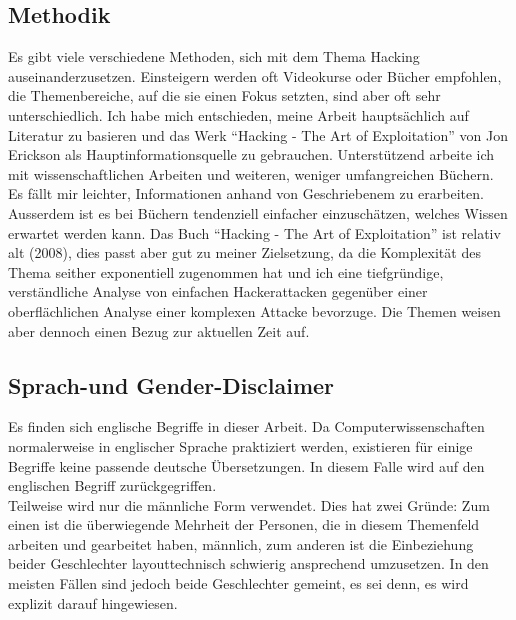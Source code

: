 \documentclass[11pt, a4paper]{article}
\begin{document}
\subsection{Methodik}
Es gibt viele verschiedene Methoden, sich mit dem Thema Hacking auseinanderzusetzen. Einsteigern werden oft Videokurse oder Bücher empfohlen, die Themenbereiche, auf die sie einen Fokus setzten, sind aber oft sehr unterschiedlich. Ich habe mich entschieden, meine Arbeit hauptsächlich auf Literatur zu basieren und das Werk ``Hacking - The Art of Exploitation'' von Jon Erickson als Hauptinformationsquelle zu gebrauchen. Unterstützend arbeite ich mit wissenschaftlichen Arbeiten und weiteren, weniger umfangreichen Büchern. Es fällt mir leichter, Informationen anhand von Geschriebenem zu erarbeiten. Ausserdem ist es bei Büchern tendenziell einfacher einzuschätzen, welches Wissen erwartet werden kann. Das Buch ``Hacking - The Art of Exploitation'' ist relativ alt (2008), dies passt aber gut zu meiner Zielsetzung, da die Komplexität des Thema seither exponentiell zugenommen hat und ich eine tiefgründige, verständliche Analyse von einfachen Hackerattacken gegenüber einer oberflächlichen Analyse einer komplexen Attacke bevorzuge. Die Themen weisen aber dennoch einen Bezug zur aktuellen Zeit auf.

\subsection*{Sprach-und Gender-Disclaimer}
Es finden sich englische Begriffe in dieser Arbeit. Da Computerwissenschaften normalerweise in englischer Sprache praktiziert werden, existieren für einige Begriffe keine passende deutsche Übersetzungen. In diesem Falle wird auf den englischen Begriff zurückgegriffen. \\ Teilweise wird nur die männliche Form verwendet. Dies hat zwei Gründe: Zum einen ist die überwiegende Mehrheit der Personen, die in diesem Themenfeld arbeiten und gearbeitet haben, männlich, zum anderen ist die Einbeziehung beider Geschlechter layouttechnisch schwierig ansprechend umzusetzen. In den meisten Fällen sind jedoch beide Geschlechter gemeint, es sei denn, es wird explizit darauf hingewiesen.

\newpage
\end{document}
